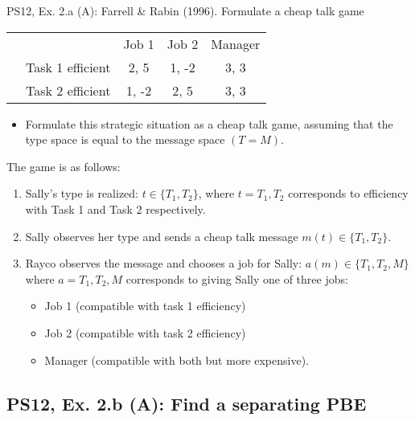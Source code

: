 \begin{frame}{PS12, Ex. 2.a (A): Farrell \& Rabin (1996). Formulate a cheap talk game}
  \begin{table}
    \begin{tabular}{ll|c|c|c|}
        & \multicolumn{1}{c}{} & \multicolumn{1}{c}{Job 1} & \multicolumn{1}{c}{Job 2} & \multicolumn{1}{c}{Manager} \\\cline{3-5}
        \parbox[t]{20mm}{}
         & Task 1 efficient & 2, 5 & 1, -2 & 3, 3 \\
         & Task 2 efficient & 1, -2 & 2, 5 & 3, 3 \\
    \end{tabular}
  \end{table}\vspace{-12pt}
  \begin{itemize}
      \item[(a)] Formulate this strategic situation as a cheap talk game, assuming that the type space is equal to the message space $(T = M)$.
    \end{itemize}\vspace{-6pt}
    The game is as follows:\vspace{-6pt}
    \begin{enumerate}
      \item Sally's type is realized: $t\in\{T_1,T_2\}$, where $t=T_1,T_2$ corresponds to efficiency with Task 1 and Task 2 respectively.
      \item Sally observes her type and sends a cheap talk message $m(t)\in\{T_1,T_2\}$.
      \item Rayco observes the message and chooses a job for Sally: $a(m)\in\{T_1,T_2,M\}$ where $a=T_1,T_2,M$ corresponds to giving Sally one of three jobs:
      \begin{itemize}\normalsize
        \item Job 1 (compatible with task 1 efficiency)
        \item Job 2 (compatible with task 2 efficiency)
        \item Manager (compatible with both but more expensive).
      \end{itemize}
    \end{enumerate}
    \vfill\null
\end{frame}



\subsection{PS12, Ex. 2.b (A): Find a separating PBE}

